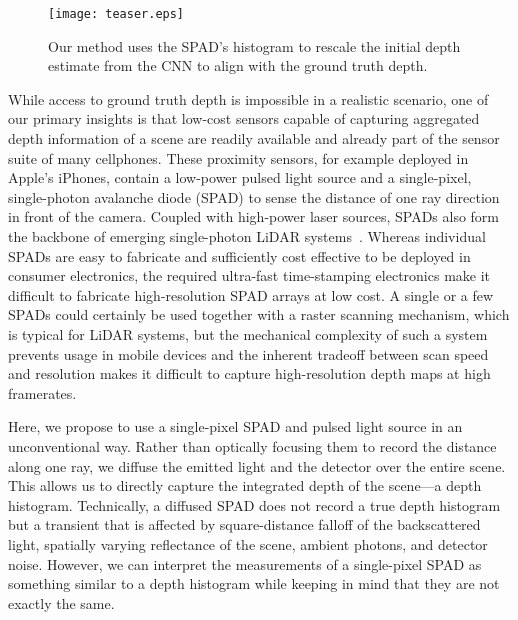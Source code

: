 
\begin{figure}
  \texttt{[image: teaser.eps]}
  \caption{Our method uses the SPAD's histogram to rescale the initial depth
    estimate from the CNN to align with the ground truth depth.}
  \label{fig:teaser}
\end{figure}

While access to ground truth depth is impossible in a realistic scenario, one of our primary insights is that low-cost sensors capable of capturing aggregated depth information of a scene are readily available and already part of the sensor suite of many cellphones. These proximity sensors, for example deployed in Apple's iPhones, contain a low-power pulsed light source and a single-pixel, single-photon avalanche diode (SPAD) to sense the distance of one ray direction in front of the camera. Coupled with high-power laser sources, SPADs also form the backbone of emerging single-photon LiDAR systems~\cite{Kirmani:2014,pawlikowska2017single,Li:2019}. Whereas individual SPADs are easy to fabricate and sufficiently cost effective to be deployed in consumer electronics, the required ultra-fast time-stamping electronics make it difficult to fabricate high-resolution SPAD arrays at low cost. A single or a few SPADs could certainly be used together with a raster scanning mechanism, which is typical for LiDAR systems, but the mechanical complexity of such a system prevents usage in mobile devices and the inherent tradeoff between scan speed and resolution makes it difficult to capture high-resolution depth maps at high framerates.

Here, we propose to use a single-pixel SPAD and pulsed light source in an unconventional way. Rather than optically focusing them to record the distance along one ray, we diffuse the emitted light and the detector over the entire scene. This allows us to directly capture the integrated depth of the scene---a depth histogram. Technically, a diffused SPAD does not record a true depth histogram but a transient that is affected by square-distance falloff of the backscattered light, spatially varying reflectance of the scene, ambient photons, and detector noise. However, we can interpret the measurements of a single-pixel SPAD as something similar to a depth histogram while keeping in mind that they are not exactly the same.

